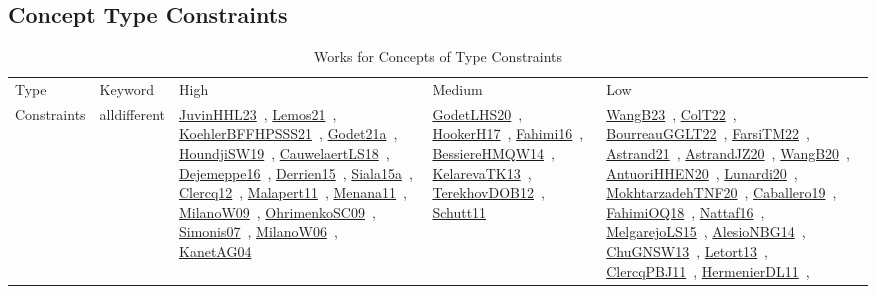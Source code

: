 \clearpage
\subsection{Concept Type Constraints}
\label{sec:Constraints}
{\scriptsize
\begin{longtable}{lp{3cm}>{\raggedright\arraybackslash}p{6cm}>{\raggedright\arraybackslash}p{6cm}>{\raggedright\arraybackslash}p{8cm}}
\rowcolor{white}\caption{Works for Concepts of Type Constraints}\\ \toprule
\rowcolor{white}Type & Keyword & High & Medium & Low\\ \midrule\endhead
\bottomrule
\endfoot
Constraints & alldifferent & \href{works/JuvinHHL23.pdf}{JuvinHHL23}~\cite{JuvinHHL23}, \href{works/Lemos21.pdf}{Lemos21}~\cite{Lemos21}, \href{works/KoehlerBFFHPSSS21.pdf}{KoehlerBFFHPSSS21}~\cite{KoehlerBFFHPSSS21}, \href{works/Godet21a.pdf}{Godet21a}~\cite{Godet21a}, \href{works/HoundjiSW19.pdf}{HoundjiSW19}~\cite{HoundjiSW19}, \href{works/CauwelaertLS18.pdf}{CauwelaertLS18}~\cite{CauwelaertLS18}, \href{works/Dejemeppe16.pdf}{Dejemeppe16}~\cite{Dejemeppe16}, \href{works/Derrien15.pdf}{Derrien15}~\cite{Derrien15}, \href{works/Siala15a.pdf}{Siala15a}~\cite{Siala15a}, \href{works/Clercq12.pdf}{Clercq12}~\cite{Clercq12}, \href{works/Malapert11.pdf}{Malapert11}~\cite{Malapert11}, \href{works/Menana11.pdf}{Menana11}~\cite{Menana11}, \href{works/MilanoW09.pdf}{MilanoW09}~\cite{MilanoW09}, \href{works/OhrimenkoSC09.pdf}{OhrimenkoSC09}~\cite{OhrimenkoSC09}, \href{works/Simonis07.pdf}{Simonis07}~\cite{Simonis07}, \href{works/MilanoW06.pdf}{MilanoW06}~\cite{MilanoW06}, \href{works/KanetAG04.pdf}{KanetAG04}~\cite{KanetAG04} & \href{works/GodetLHS20.pdf}{GodetLHS20}~\cite{GodetLHS20}, \href{works/HookerH17.pdf}{HookerH17}~\cite{HookerH17}, \href{works/Fahimi16.pdf}{Fahimi16}~\cite{Fahimi16}, \href{works/BessiereHMQW14.pdf}{BessiereHMQW14}~\cite{BessiereHMQW14}, \href{works/KelarevaTK13.pdf}{KelarevaTK13}~\cite{KelarevaTK13}, \href{works/TerekhovDOB12.pdf}{TerekhovDOB12}~\cite{TerekhovDOB12}, \href{works/Schutt11.pdf}{Schutt11}~\cite{Schutt11} & \href{works/WangB23.pdf}{WangB23}~\cite{WangB23}, \href{works/ColT22.pdf}{ColT22}~\cite{ColT22}, \href{works/BourreauGGLT22.pdf}{BourreauGGLT22}~\cite{BourreauGGLT22}, \href{works/FarsiTM22.pdf}{FarsiTM22}~\cite{FarsiTM22}, \href{works/Astrand21.pdf}{Astrand21}~\cite{Astrand21}, \href{works/AstrandJZ20.pdf}{AstrandJZ20}~\cite{AstrandJZ20}, \href{works/WangB20.pdf}{WangB20}~\cite{WangB20}, \href{works/AntuoriHHEN20.pdf}{AntuoriHHEN20}~\cite{AntuoriHHEN20}, \href{works/Lunardi20.pdf}{Lunardi20}~\cite{Lunardi20}, \href{works/MokhtarzadehTNF20.pdf}{MokhtarzadehTNF20}~\cite{MokhtarzadehTNF20}, \href{works/Caballero19.pdf}{Caballero19}~\cite{Caballero19}, \href{works/FahimiOQ18.pdf}{FahimiOQ18}~\cite{FahimiOQ18}, \href{works/Nattaf16.pdf}{Nattaf16}~\cite{Nattaf16}, \href{works/MelgarejoLS15.pdf}{MelgarejoLS15}~\cite{MelgarejoLS15}, \href{works/AlesioNBG14.pdf}{AlesioNBG14}~\cite{AlesioNBG14}, \href{works/ChuGNSW13.pdf}{ChuGNSW13}~\cite{ChuGNSW13}, \href{works/Letort13.pdf}{Letort13}~\cite{Letort13}, \href{works/ClercqPBJ11.pdf}{ClercqPBJ11}~\cite{ClercqPBJ11}, \href{works/HermenierDL11.pdf}{HermenierDL11}~\cite{HermenierDL11}, 
\end{longtable}}
